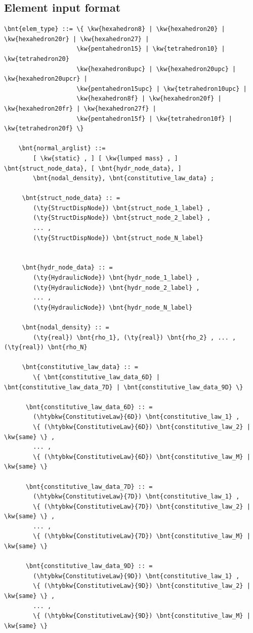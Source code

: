 \subsection{Element input format}
\label{sec:EL:SOLID:INPUT:FORMAT}
\begin{Verbatim}[commandchars=\\\{\}]
  \bnt{elem_type} ::= \{ \kw{hexahedron8} | \kw{hexahedron20} | \kw{hexahedron20r} | \kw{hexahedron27} |
                    \kw{pentahedron15} | \kw{tetrahedron10} | \kw{tetrahedron20}
                    \kw{hexahedron8upc} | \kw{hexahedron20upc} | \kw{hexahedron20upcr} |
                    \kw{pentahedron15upc} | \kw{tetrahedron10upc} |
                    \kw{hexahedron8f} | \kw{hexahedron20f} | \kw{hexahedron20fr} | \kw{hexahedron27f} |
                    \kw{pentahedron15f} | \kw{tetrahedron10f} | \kw{tetrahedron20f} \}

    \bnt{normal_arglist} ::=
        [ \kw{static} , ] [ \kw{lumped mass} , ] \bnt{struct_node_data}, [ \bnt{hydr_node_data}, ]
        \bnt{nodal_density}, \bnt{constitutive_law_data} ;

     \bnt{struct_node_data} :: =
        (\ty{StructDispNode}) \bnt{struct_node_1_label} ,
        (\ty{StructDispNode}) \bnt{struct_node_2_label} ,
        ... ,
        (\ty{StructDispNode}) \bnt{struct_node_N_label}


     \bnt{hydr_node_data} :: =
        (\ty{HydraulicNode}) \bnt{hydr_node_1_label} ,
        (\ty{HydraulicNode}) \bnt{hydr_node_2_label} ,
        ... ,
        (\ty{HydraulicNode}) \bnt{hydr_node_N_label}

     \bnt{nodal_density} :: =
        (\ty{real}) \bnt{rho_1}, (\ty{real}) \bnt{rho_2} , ... , (\ty{real}) \bnt{rho_N}

     \bnt{constitutive_law_data} :: =
        \{ \bnt{constitutive_law_data_6D} | \bnt{constitutive_law_data_7D} | \bnt{constitutive_law_data_9D} \}

      \bnt{constitutive_law_data_6D} :: =
        (\htybkw{ConstitutiveLaw}{6D}) \bnt{constitutive_law_1} ,
        \{ (\htybkw{ConstitutiveLaw}{6D}) \bnt{constitutive_law_2} | \kw{same} \} ,
        ... ,
        \{ (\htybkw{ConstitutiveLaw}{6D}) \bnt{constitutive_law_M} | \kw{same} \}

      \bnt{constitutive_law_data_7D} :: =
        (\htybkw{ConstitutiveLaw}{7D}) \bnt{constitutive_law_1} ,
        \{ (\htybkw{ConstitutiveLaw}{7D}) \bnt{constitutive_law_2} | \kw{same} \} ,
        ... ,
        \{ (\htybkw{ConstitutiveLaw}{7D}) \bnt{constitutive_law_M} | \kw{same} \}

      \bnt{constitutive_law_data_9D} :: =
        (\htybkw{ConstitutiveLaw}{9D}) \bnt{constitutive_law_1} ,
        \{ (\htybkw{ConstitutiveLaw}{9D}) \bnt{constitutive_law_2} | \kw{same} \} ,
        ... ,
        \{ (\htybkw{ConstitutiveLaw}{9D}) \bnt{constitutive_law_M} | \kw{same} \}
\end{Verbatim}

